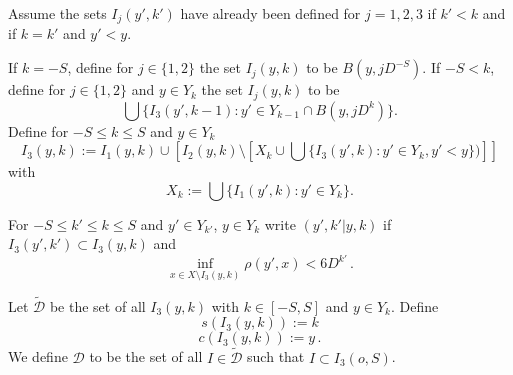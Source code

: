 Assume the sets ${I}_j(y',k')$ have already been defined for $j=1,2,3$ if $k'<k$ and if $k=k'$ and $y'<y$.




If $k=-S$, define for $j\in \{1,2\}$ the set
${I}_j(y,k)$ to be $B(y,jD^{-S})$.
If $-S<k$, define for $j\in \{1,2\}$
and $y\in Y_k$ the set ${I}_j(y,k)$ to be
\begin{equation}\label{defineij}
\bigcup\{I_3(y',k-1):
y'\in Y_{k-1}\cap B(y,jD^k)\}.
\end{equation}
Define for {$-S\leq k\leq S$} and $y\in Y_k$
\begin{equation}\label{definei3}
I_3(y,k):={I_1}(y,k)\cup \left[{I_2}(y,k)\setminus \left[X_k\cup \bigcup\{I_3(y',k):y'\in Y_{k}, y'<y\})\right]\right]
\end{equation}
with
\begin{equation}
      X_{k}:=\bigcup\{I_1(y', k):y'\in Y_{k}\}.
\end{equation}










For $-S\le k'\le k\le S$ and $y'\in Y_{k'}$, $y\in Y_k$
write $(y',k'|y,k)$ if $I_3(y',k')\subset I_3(y,k)$ and
\begin{equation}\label{bdcond}
    \inf_{x\in X\setminus I_3(y,k)}\rho(y',x)<6D^{k'}\, .
\end{equation}












Let $\tilde{\mathcal{D}}$ be the set of all $I_3(y,k)$ with $k\in [-S,S]$ and
$y\in Y_k$. Define
\begin{equation}
s(I_3(y,k)):=k
\end{equation}
\begin{equation}
c(I_3(y,k)):=y\,.
\end{equation}
We define $\mathcal{D}$ to be the set of all $I \in \tilde{\mathcal{D}}$ such that $I \subset I_3(o, S)$.



